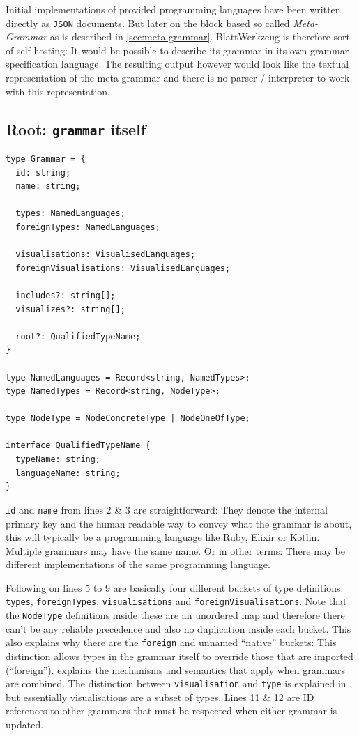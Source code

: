 \documentclass[]{report}
\begin{document}
Initial implementations of provided programming languages have been written directly as \texttt{JSON} documents. But later on the block based so called \textit{Meta-Grammar} as is described in \cref{sec:meta-grammar}. Blatt\-Werkzeug is therefore sort of self hosting: It would be possible to describe its grammar in its own grammar specification language. The resulting output however would look like the textual representation of the meta grammar and there is no parser / interpreter to work with this representation.

\subsection{Root: \texttt{grammar} itself}

\begin{listing}[H]
\begin{verbatim}
type Grammar = {
  id: string;
  name: string;

  types: NamedLanguages;
  foreignTypes: NamedLanguages;

  visualisations: VisualisedLanguages;
  foreignVisualisations: VisualisedLanguages;

  includes?: string[];
  visualizes?: string[];

  root?: QualifiedTypeName;
}

type NamedLanguages = Record<string, NamedTypes>;
type NamedTypes = Record<string, NodeType>;

type NodeType = NodeConcreteType | NodeOneOfType;

interface QualifiedTypeName {
  typeName: string;
  languageName: string;
}
\end{verbatim}
\caption{Type definitions of Blatt\-Werkzeug Grammar and accompanying core types}
\label{lst:grammar-and-core-types-description}
\end{listing}

\texttt{id} and \texttt{name} from lines 2 \& 3 are straightforward: They denote the internal primary key and the human readable way to convey what the grammar is about, this will typically be a programming language like Ruby, Elixir or Kotlin. Multiple grammars may have the same name. Or in other terms: There may be different implementations of the same programming language.

Following on lines 5 to 9 are basically four different buckets of type definitions: \texttt{types}, \texttt{foreign\-Types}, \texttt{visuali\-sations} and \texttt{foreignVisualisations}. Note that the \texttt{NodeType} definitions inside these are an unordered map and therefore there can't be any reliable precedence and also no duplication inside each bucket. This also explains why there are the \texttt{foreign} and unnamed \enquote{native} buckets: This distinction allows types in the grammar itself to override those that are imported (\enquote{foreign}).  explains the mechanisms and semantics that apply when grammars are combined. The distinction between \texttt{visualisation} and \texttt{type} is explained in , but essentially visualisations are a subset of types. Lines 11 \& 12 are ID references to other grammars that must be respected when either grammar is updated.
\end{document}
